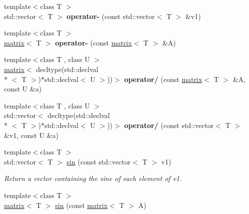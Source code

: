 \begin{DoxyCompactItemize}
\item 
\hypertarget{namespacekeycpp_ac2665554c04ea23aad98e77d1618ca6b}{{\footnotesize template$<$class T $>$ }\\std\-::vector$<$ T $>$ {\bfseries operator-\/} (const std\-::vector$<$ T $>$ \&v1)}\label{namespacekeycpp_ac2665554c04ea23aad98e77d1618ca6b}

\item 
\hypertarget{namespacekeycpp_a390125160a7febd08d5c30629f4f698f}{{\footnotesize template$<$class T $>$ }\\\hyperlink{classkeycpp_1_1matrix}{matrix}$<$ T $>$ {\bfseries operator-\/} (const \hyperlink{classkeycpp_1_1matrix}{matrix}$<$ T $>$ \&A)}\label{namespacekeycpp_a390125160a7febd08d5c30629f4f698f}

\item 
\hypertarget{namespacekeycpp_a3852c35cfcc8caa784465a26d04c68a1}{{\footnotesize template$<$class T , class U $>$ }\\\hyperlink{classkeycpp_1_1matrix}{matrix}$<$ decltype(std\-::declval\\*
$<$ T $>$)$\ast$std\-::declval$<$ U $>$))$>$ {\bfseries operator/} (const \hyperlink{classkeycpp_1_1matrix}{matrix}$<$ T $>$ \&A, const U \&a)}\label{namespacekeycpp_a3852c35cfcc8caa784465a26d04c68a1}

\item 
\hypertarget{namespacekeycpp_a394f23f09cf122a8e8c20a7afd40f58e}{{\footnotesize template$<$class T , class U $>$ }\\std\-::vector$<$ decltype(std\-::declval\\*
$<$ T $>$)$\ast$std\-::declval$<$ U $>$))$>$ {\bfseries operator/} (const std\-::vector$<$ T $>$ \&v1, const U \&a)}\label{namespacekeycpp_a394f23f09cf122a8e8c20a7afd40f58e}

\item 
\hypertarget{namespacekeycpp_a1ebc4ddf6e567714f63f0dbb8a984745}{{\footnotesize template$<$class T $>$ }\\std\-::vector$<$ T $>$ \hyperlink{namespacekeycpp_a1ebc4ddf6e567714f63f0dbb8a984745}{sin} (const std\-::vector$<$ T $>$ v1)}\label{namespacekeycpp_a1ebc4ddf6e567714f63f0dbb8a984745}

\begin{DoxyCompactList}\small\item\em Return a vector containing the sine of each element of v1. \end{DoxyCompactList}\item 
\hypertarget{namespacekeycpp_a159a28c69282a740e381465a0e71bf23}{{\footnotesize template$<$class T $>$ }\\\hyperlink{classkeycpp_1_1matrix}{matrix}$<$ T $>$ \hyperlink{namespacekeycpp_a159a28c69282a740e381465a0e71bf23}{sin} (const \hyperlink{classkeycpp_1_1matrix}{matrix}$<$ T $>$ A)}\label{namespacekeycpp_a159a28c69282a740e381465a0e71bf23}


\end{DoxyCompactItemize}
